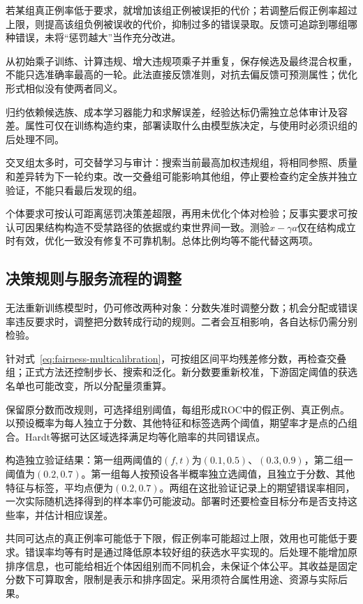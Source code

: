 若某组真正例率低于要求，就增加该组正例被误拒的代价；若调整后假正例率超过上限，则提高该组负例被误收的代价，抑制过多的错误录取。反馈可追踪到哪组哪种错误，未将“惩罚越大”当作充分改进。

从初始乘子训练、计算违规、增大违规项乘子并重复，保存候选及最终混合权重，不能只选准确率最高的一轮。此法直接反馈准则，对抗去偏反馈可预测属性；优化形式相似没有使两者同义。

归约依赖候选族、成本学习器能力和求解误差，经验达标仍需独立总体审计及容差。属性可仅在训练构造约束，部署读取什么由模型族决定，与使用时必须识组的后处理不同。

交叉组太多时，可交替学习与审计：搜索当前最高加权违规组，将相同参照、质量和差异转为下一轮约束。改一交叠组可能影响其他组，停止要检查约定全族并独立验证，不能只看最后发现的组。

个体要求可按认可距离惩罚决策差超限，再用未优化个体对检验；反事实要求可按认可因果结构构造不受禁路径的依据或约束世界间一致。测验$x-\gamma a$仅在结构成立时有效，优化一致没有修复不可靠机制。总体比例均等不能代替这两项。

\subsection{决策规则与服务流程的调整}
\label{sec:fairness-decision-intervention}

无法重新训练模型时，仍可修改两种对象：分数失准时调整分数；机会分配或错误率违反要求时，调整把分数转成行动的规则。二者会互相影响，各自达标仍需分别检验。

针对式~\eqref{eq:fairness-multicalibration}，可按组区间平均残差修分数，再检查交叠组；正式方法还控制步长、搜索和泛化。新分数要重新校准，下游固定阈值的获选名单也可能改变，所以分配量须重算。

保留原分数而改规则，可选择组别阈值，每组形成ROC中的假正例、真正例点。以预设概率为每人独立于分数、其他特征和标签选两个阈值，期望率才是点的凸组合。Hardt等据可达区域选择满足均等化赔率的共同错误点。

\begin{example}[随机化如何补出共同错误率]
\label{ex:fairness-random-threshold}
构造独立验证结果：第一组两阈值的$(f,t)$为$(0.1,0.5)$、$(0.3,0.9)$，第二组一阈值为$(0.2,0.7)$。第一组每人按预设各半概率独立选阈值，且独立于分数、其他特征与标签，平均点便为$(0.2,0.7)$。两组在这批验证记录上的期望错误率相同，一次实际随机选择得到的样本率仍可能波动。部署时还要检查目标分布是否支持这些率，并估计相应误差。
\end{example}

共同可达点的真正例率可能低于下限，假正例率可能超过上限，效用也可能低于要求。错误率均等有时是通过降低原本较好组的获选水平实现的。后处理不能增加原排序信息，也可能给相近个体因组别而不同机会，未保证个体公平。其收益是固定分数下可算取舍，限制是表示和排序固定。采用须符合属性用途、资源与实际后果。

